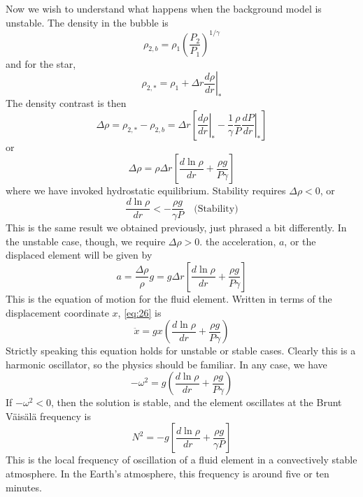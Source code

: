 \documentclass[10pt]{article}
\numberwithin{equation}{section}
\begin{document}
Now we wish to understand what happens when the background model is
unstable. The density in the bubble is
\begin{equation}
  \label{eq:21}
  \rho_{2,b}=\rho_1\left(\frac{P_2}{P_1}\right)^{1/\gamma}
\end{equation}
and for the star,
\begin{equation}
  \label{eq:22}
  \rho_{2,*}=\rho_1+\left.\Delta r\frac{d\rho}{dr}\right|_*
\end{equation}
The density contrast is then
\begin{equation}
  \label{eq:23}
  \Delta \rho=\rho_{2,*}-\rho_{2,b}=\Delta r\left[\left.\frac{d\rho}{dr}
\right|_*-\frac{1}{\gamma}\frac{\rho}{P}\left.\frac{dP}{dr}\right|_*\right]
\end{equation}
or
\begin{equation}
  \label{eq:24}
  \Delta\rho=\rho\Delta r\left[\frac{d\ln\rho}{dr}+\frac{\rho g}{P\gamma}
\right]
\end{equation}
where we have invoked hydrostatic equilibrium. Stability requires
$\Delta\rho<0$, or
\begin{equation}
  \label{eq:25}
  \boxed{\frac{d\ln\rho}{dr}<-\frac{\rho g}{\gamma P}\quad\textrm
{(Stability)}}
\end{equation}
This is the same result we obtained previously, just phrased a bit
differently. In the unstable case, though, we require $\Delta\rho>0$. the
acceleration, $a$, or the displaced element will be given by 
\begin{equation}
  \label{eq:26}
  a=\frac{\Delta\rho}{\rho}g=g\Delta
  r\left[\frac{d\ln\rho}{dr}+\frac{\rho g}{P\gamma}\right]
\end{equation}
This is the equation of motion for the fluid element. Written in
terms of the displacement coordinate $x$, \eqref{eq:26} is
\begin{equation}
  \label{eq:27}
  \ddot{x}=gx\left(\frac{d\ln\rho}{dr}+\frac{\rho g}{P\gamma}\right)
\end{equation}
Strictly speaking this equation holds for unstable or stable
cases. Clearly this is a harmonic oscillator, so the physics should be
familiar. In any case, we have
\begin{equation}
  \label{eq:28}
  -\omega^2=g\left(\frac{d\ln\rho}{dr}+\frac{\rho g}{P \gamma}\right)
\end{equation}
If $-\omega^2<0$, then the solution is stable, and the element
oscillates at the Brunt V\"{a}is\"{a}l\"{a} frequency is 
\begin{equation}
  \label{eq:29}
  N^2=-g\left[\frac{d\ln\rho}{dr}+\frac{\rho g}{\gamma P}\right]
\end{equation}
This is the local frequency of oscillation of a fluid element in a
convectively stable atmosphere. In the Earth's atmosphere, this
frequency is around five or ten minutes.\\
\end{document}
